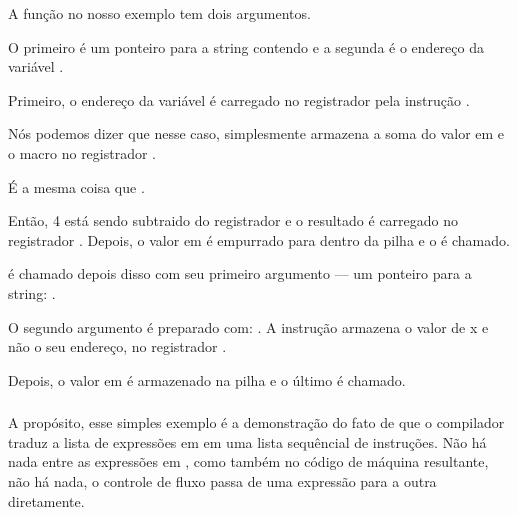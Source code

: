 A função \scanf no nosso exemplo tem dois argumentos.

O primeiro é um ponteiro para a string contendo  e a segunda é o endereço da variável .

Primeiro, o endereço da variável  é carregado no registrador \EAX pela instrução .

\PTBRph{}

Nós podemos dizer que nesse caso, \LEA simplesmente armazena a soma do valor em \EBP e o macro  no registrador \EAX.

É a mesma coisa que .

Então, 4 está sendo subtraido do registrador \EBP e o resultado é carregado no registrador \EAX.
Depois, o valor em \EAX é empurrado para dentro da pilha e o \scanf é chamado.

\printf é chamado depois disso com seu primeiro argumento --- um ponteiro para a string:
.

O segundo argumento é preparado com: .
A instrução armazena o valor de x e não o seu endereço, no registrador \ECX.

Depois, o valor em \ECX é armazenado na pilha e o último \printf é chamado.


\subsubsection{\PTBRph{}}

A propósito, esse simples exemplo é a demonstração do fato de que o compilador traduz a lista de expressões em \CCpp em uma lista sequêncial de instruções.
Não há nada entre as expressões em \CCpp, como também no código de máquina resultante, não há nada, o controle de fluxo passa de uma expressão para a outra diretamente.

